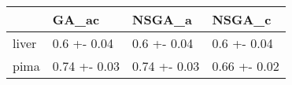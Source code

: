 \begin{tabular}{llll}
\toprule
{} &         GA\_ac &        NSGA\_a &        NSGA\_c \\
\midrule
liver &   0.6 +- 0.04 &   0.6 +- 0.04 &   0.6 +- 0.04 \\
pima  &  0.74 +- 0.03 &  0.74 +- 0.03 &  0.66 +- 0.02 \\
\bottomrule
\end{tabular}
